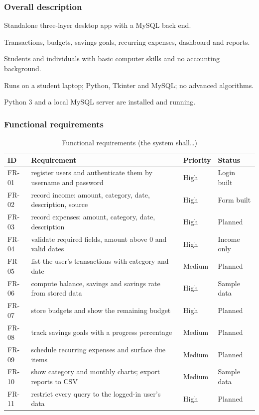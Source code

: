 \documentclass[12pt,a4paper]{article}
\begin{document}
\subsubsection{Overall description}
\begin{description}[style=nextline]
  \item[Product perspective] Standalone three-layer desktop app with a MySQL back end.
  \item[Product functions] Transactions, budgets, savings goals, recurring expenses, dashboard and reports.
  \item[Users] Students and individuals with basic computer skills and no accounting background.
  \item[Constraints] Runs on a student laptop; Python, Tkinter and MySQL; no advanced algorithms.
  \item[Assumptions] Python 3 and a local MySQL server are installed and running.
\end{description}

\subsubsection{Functional requirements}
\begin{table}[H]
\centering
\caption{Functional requirements (the system shall\ldots)}
\begin{tabularx}{\textwidth}{@{}lXll@{}}
  \toprule
  \textbf{ID} & \textbf{Requirement} & \textbf{Priority} & \textbf{Status}\\
  \midrule
  FR-01 & register users and authenticate them by username and password & High & Login built\\
  FR-02 & record income: amount, category, date, description, source & High & Form built\\
  FR-03 & record expenses: amount, category, date, description & High & Planned\\
  FR-04 & validate required fields, amount above 0 and valid dates & High & Income only\\
  FR-05 & list the user's transactions with category and date & Medium & Planned\\
  FR-06 & compute balance, savings and savings rate from stored data & High & Sample data\\
  FR-07 & store budgets and show the remaining budget & High & Planned\\
  FR-08 & track savings goals with a progress percentage & Medium & Planned\\
  FR-09 & schedule recurring expenses and surface due items & Medium & Planned\\
  FR-10 & show category and monthly charts; export reports to CSV & Medium & Sample data\\
  FR-11 & restrict every query to the logged-in user's data & High & Planned\\
  \bottomrule
\end{tabularx}
\end{table}
\end{document}
